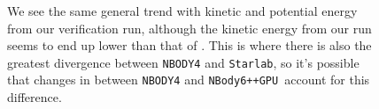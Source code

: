 \documentclass[preprint1]{aastex}
\newcommand\nbody{\texttt{NBody6++GPU }}
\numberwithin{equation}{section}
\begin{document}
\begin{figure}%
    \centering
    \qquad   
    \qquad
    \qquad
    \caption{We see the same general trend with kinetic and potential energy from our verification run, although the kinetic energy from our run seems to end up lower than that of \citet{2009Anders}.  This is where there is also the greatest divergence between \texttt{NBODY4} and \texttt{Starlab}, so it's possible that changes in between \texttt{NBODY4} and \nbody account for this difference.}
    \label{fig:verifications2}
\end{figure}
\end{document}
